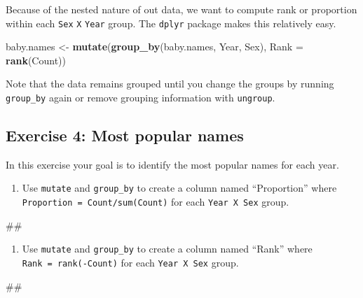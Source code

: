 \documentclass[]{book}
\newenvironment{Shaded}{\begin{snugshade}}{\end{snugshade}}
\newcommand{\KeywordTok}[1]{\textcolor[rgb]{0.13,0.29,0.53}{\textbf{#1}}}
\newcommand{\DataTypeTok}[1]{\textcolor[rgb]{0.13,0.29,0.53}{#1}}
\newcommand{\StringTok}[1]{\textcolor[rgb]{0.31,0.60,0.02}{#1}}
\newcommand{\NormalTok}[1]{#1}
\providecommand{\tightlist}{%
  \setlength{\itemsep}{0pt}\setlength{\parskip}{0pt}}
\begin{document}
Because of the nested nature of out data, we want to compute rank or
proportion within each \texttt{Sex} \texttt{X} \texttt{Year} group. The
\texttt{dplyr} package makes this relatively easy.

\begin{Shaded}
\begin{Highlighting}[]
\NormalTok{baby.names <-}\StringTok{ }\KeywordTok{mutate}\NormalTok{(}\KeywordTok{group_by}\NormalTok{(baby.names, Year, Sex),}
                     \DataTypeTok{Rank =} \KeywordTok{rank}\NormalTok{(Count))}
\end{Highlighting}
\end{Shaded}

Note that the data remains grouped until you change the groups by
running \texttt{group\_by} again or remove grouping information with
\texttt{ungroup}.

\subsection{Exercise 4: Most popular
names}\label{exercise-4-most-popular-names}

In this exercise your goal is to identify the most popular names for
each year.

\begin{enumerate}
\def\labelenumi{\arabic{enumi}.}
\tightlist
\item
  Use \texttt{mutate} and \texttt{group\_by} to create a column named
  ``Proportion'' where \texttt{Proportion\ =\ Count/sum(Count)} for each
  \texttt{Year\ X\ Sex} group.
\end{enumerate}

\begin{Shaded}
\begin{Highlighting}[]
\NormalTok{##}
\end{Highlighting}
\end{Shaded}

\begin{enumerate}
\def\labelenumi{\arabic{enumi}.}
\setcounter{enumi}{1}
\tightlist
\item
  Use \texttt{mutate} and \texttt{group\_by} to create a column named
  ``Rank'' where \texttt{Rank\ =\ rank(-Count)} for each
  \texttt{Year\ X\ Sex} group.
\end{enumerate}

\begin{Shaded}
\begin{Highlighting}[]
\NormalTok{##}
\end{Highlighting}
\end{Shaded}
\end{document}
